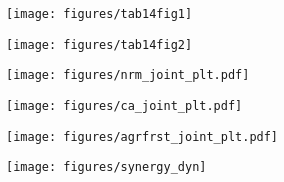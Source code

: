 \documentclass[11pt]{beamer}
\begin{document}
\begin{frame}
\label{tab14fig1}
\texttt{[image: figures/tab14fig1]}
\hyperlink{scndpg}{}
\end{frame}


\begin{frame}
\label{tab14fig2}
\texttt{[image: figures/tab14fig2]}
\hyperlink{scndpg}{}
\end{frame}


\begin{frame}
\label{nrmjointplt}
\texttt{[image: figures/nrm\_joint\_plt.pdf]}
\hyperlink{frthpg}{}
\end{frame}

\begin{frame}
\label{cajointplt}
\texttt{[image: figures/ca\_joint\_plt.pdf]}
\hyperlink{frthpg}{}
\end{frame}


\begin{frame}
\label{agrfrstjointplt}
\texttt{[image: figures/agrfrst\_joint\_plt.pdf]}
\hyperlink{frthpg}{}
\end{frame}


\begin{frame}
\label{synergydyn}
\texttt{[image: figures/synergy\_dyn]}
\hyperlink{frthpg}{}
\end{frame}
\end{document}
